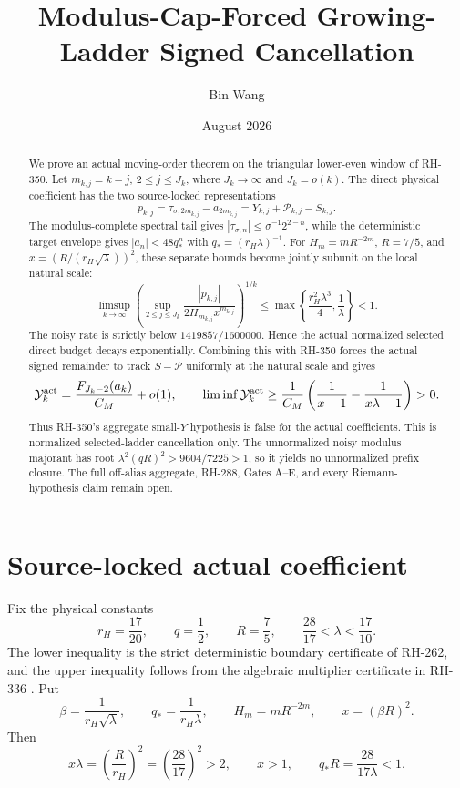 \documentclass[11pt]{article}
\title{Modulus-Cap-Forced Growing-Ladder Signed Cancellation}
\author{Bin Wang}
\date{August 2026}
\theoremstyle{remark}
\newcommand{\cP}{\mathcal P}
\newcommand{\cY}{\mathcal Y}
\begin{document}
\maketitle

\begin{abstract}
We prove an actual moving-order theorem on the triangular lower-even window
of RH-350.  Let $m_{k,j}=k-j$, $2\le j\le J_k$, where
$J_k\to\infty$ and $J_k=o(k)$.  The direct physical coefficient has the two
source-locked representations
\[
 p_{k,j}=\tau_{\sigma,2m_{k,j}}-a_{2m_{k,j}}
 =Y_{k,j}+\cP_{k,j}-S_{k,j}.
\]
The modulus-complete spectral tail gives
$|\tau_{\sigma,n}|\le\sigma^{-1}2^{2-n}$, while the deterministic target
envelope gives $|a_n|<48q_*^n$ with
$q_*=(r_H\lambda)^{-1}$.  For
$H_m=mR^{-2m}$, $R=7/5$, and
$x=(R/(r_H\sqrt\lambda))^2$, these separate bounds become jointly
subunit on the local natural scale:
\[
 \limsup_{k\to\infty}
 \left(
  \sup_{2\le j\le J_k}
  \frac{|p_{k,j}|}{2H_{m_{k,j}}x^{m_{k,j}}}
 \right)^{1/k}
 \le
 \max\left\{\frac{r_H^2\lambda^3}{4},\frac1\lambda\right\}<1.
\]
The noisy rate is strictly below $1419857/1600000$.  Hence the actual
normalized selected direct budget decays exponentially.  Combining this
with RH-350 forces the actual signed remainder to track
$S-\cP$ uniformly at the natural scale and gives
\[
 \cY_k^{\rm act}
 =\frac{F_{J_k-2}(a_k)}{C_M}+o(1),
 \qquad
 \liminf\cY_k^{\rm act}\ge
 \frac1{C_M}\left(\frac1{x-1}-\frac1{x\lambda-1}\right)>0.
\]
Thus RH-350's aggregate small-$Y$ hypothesis is false for the actual
coefficients.  This is normalized selected-ladder cancellation only.  The
unnormalized noisy modulus majorant has root
$\lambda^2(qR)^2>9604/7225>1$, so it yields no unnormalized prefix
closure.  The full off-alias aggregate, RH-288, Gates A--E, and every
Riemann-hypothesis claim remain open.
\end{abstract}

\section{Source-locked actual coefficient}

Fix the physical constants
\begin{equation}\label{eq:constants}
 r_H=\frac{17}{20},\qquad q=\frac12,\qquad R=\frac75,
 \qquad \frac{28}{17}<\lambda<\frac{17}{10}.
\end{equation}
The lower inequality is the strict deterministic boundary certificate of
RH-262, and the upper inequality follows from the algebraic multiplier
certificate in RH-336
\citep{WangBoundaryBudget2026,WangProjectorMass2026}.  Put
\begin{equation}\label{eq:scales}
 \beta=\frac1{r_H\sqrt\lambda},\qquad
 q_*=\frac1{r_H\lambda},\qquad
 H_m=mR^{-2m},\qquad
 x=(\beta R)^2.
\end{equation}
Then
\begin{equation}\label{eq:x-identities}
 x\lambda=\left(\frac{R}{r_H}\right)^2
 =\left(\frac{28}{17}\right)^2>2,
 \qquad x>1,
 \qquad q_*R=\frac{28}{17\lambda}<1.
\end{equation}
\end{document}
